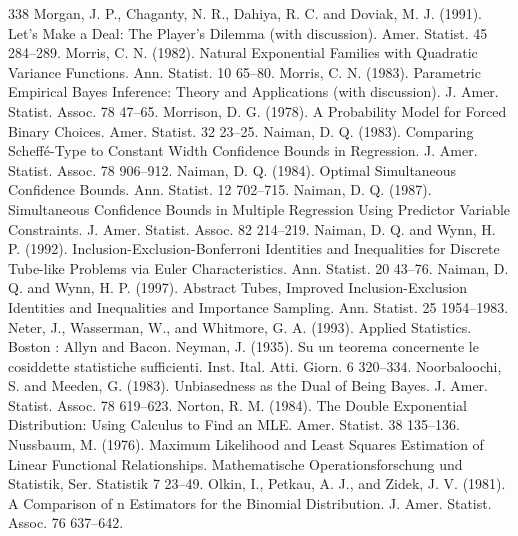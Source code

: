 \begin{thebibliography}{338}
\label{bib:source223} Morgan, J. P., Chaganty, N. R., Dahiya, R. C. and Doviak, M. J. (1991). Let’s Make a Deal: The Player’s Dilemma (with discussion). Amer. Statist. 45 284–289.
\label{bib:source224} Morris, C. N. (1982). Natural Exponential Families with Quadratic Variance Functions. Ann. Statist. 10 65–80.
\label{bib:source225} Morris, C. N. (1983). Parametric Empirical Bayes Inference: Theory and Applications (with discussion). J. Amer. Statist. Assoc. 78 47–65.
\label{bib:source226} Morrison, D. G. (1978). A Probability Model for Forced Binary Choices. Amer. Statist. 32 23–25.
\label{bib:source227} Naiman, D. Q. (1983). Comparing Scheffé-Type to Constant Width Confidence Bounds in Regression. J. Amer. Statist. Assoc. 78 906–912.
\label{bib:source228} Naiman, D. Q. (1984). Optimal Simultaneous Confidence Bounds. Ann. Statist. 12 702–715.
\label{bib:source229} Naiman, D. Q. (1987). Simultaneous Confidence Bounds in Multiple Regression Using Predictor Variable Constraints. J. Amer. Statist. Assoc. 82 214–219.
\label{bib:source230} Naiman, D. Q. and Wynn, H. P. (1992). Inclusion-Exclusion-Bonferroni Identities and Inequalities for Discrete Tube-like Problems via Euler Characteristics. Ann. Statist. 20 43–76.
\label{bib:source231} Naiman, D. Q. and Wynn, H. P. (1997). Abstract Tubes, Improved Inclusion-Exclusion Identities and Inequalities and Importance Sampling. Ann. Statist. 25 1954–1983.
\label{bib:source232} Neter, J., Wasserman, W., and Whitmore, G. A. (1993). Applied Statistics. Boston : Allyn and Bacon.
\label{bib:source233} Neyman, J. (1935). Su un teorema concernente le cosiddette statistiche sufficienti. Inst. Ital. Atti. Giorn. 6 320–334.
\label{bib:source234} Noorbaloochi, S. and Meeden, G. (1983). Unbiasedness as the Dual of Being Bayes. J. Amer. Statist. Assoc. 78 619–623.
\label{bib:source235} Norton, R. M. (1984). The Double Exponential Distribution: Using Calculus to Find an MLE. Amer. Statist. 38 135–136.
\label{bib:source236} Nussbaum, M. (1976). Maximum Likelihood and Least Squares Estimation of Linear Functional Relationships. Mathematische Operationsforschung und Statistik, Ser. Statistik 7 23–49.
\label{bib:source237} Olkin, I., Petkau, A. J., and Zidek, J. V. (1981). A Comparison of n Estimators for the Binomial Distribution. J. Amer. Statist. Assoc. 76 637–642.

\end{thebibliography}
